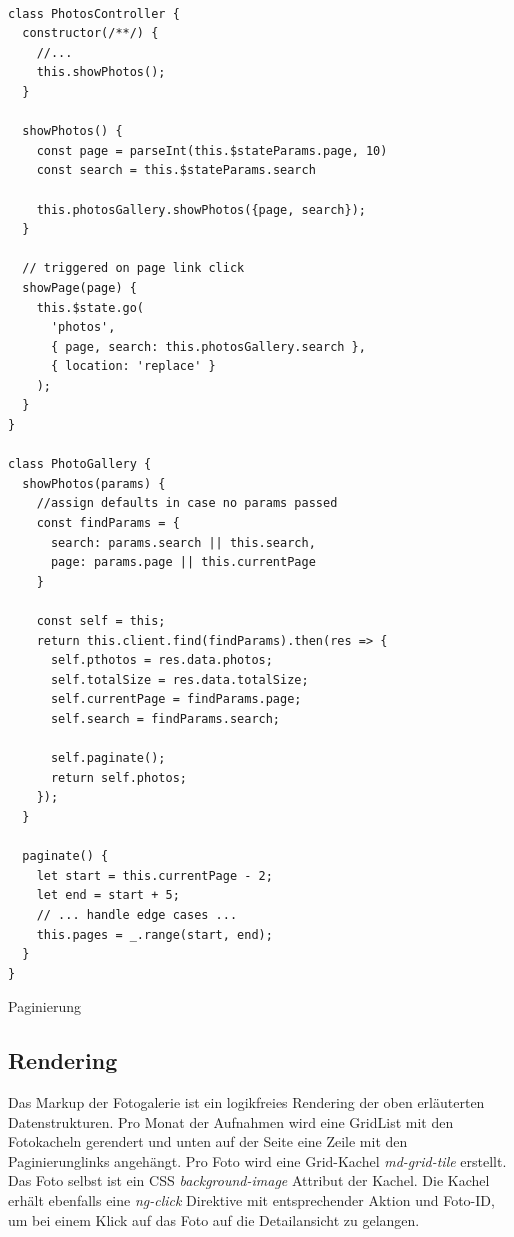 \begin{listing}[H]
\begin{verbatim}

class PhotosController {
  constructor(/**/) {
    //...
    this.showPhotos();
  }

  showPhotos() {
    const page = parseInt(this.$stateParams.page, 10)
    const search = this.$stateParams.search

    this.photosGallery.showPhotos({page, search});
  }

  // triggered on page link click
  showPage(page) {
    this.$state.go(
      'photos',
      { page, search: this.photosGallery.search },
      { location: 'replace' }
    );
  }
}

class PhotoGallery {
  showPhotos(params) {
    //assign defaults in case no params passed
    const findParams = {
      search: params.search || this.search,
      page: params.page || this.currentPage
    }

    const self = this;
    return this.client.find(findParams).then(res => {
      self.pthotos = res.data.photos;
      self.totalSize = res.data.totalSize;
      self.currentPage = findParams.page;
      self.search = findParams.search;

      self.paginate();
      return self.photos;
    });
  }

  paginate() {
    let start = this.currentPage - 2;
    let end = start + 5;
    // ... handle edge cases ...
    this.pages = _.range(start, end);
  }
}

\end{verbatim}
\caption{Paginierung}
\label{lst:pagination}
\end{listing}

\subsection{Rendering}
\label{sec:rendering}

Das Markup der Fotogalerie ist ein logikfreies Rendering der oben erläuterten Datenstrukturen. Pro Monat der Aufnahmen wird eine GridList mit den Fotokacheln gerendert und unten auf der Seite eine Zeile mit den Paginierunglinks angehängt.
Pro Foto wird eine Grid-Kachel \textit{md-grid-tile} erstellt. Das Foto selbst ist ein CSS \textit{background-image} Attribut der Kachel. Die Kachel erhält ebenfalls eine \textit{ng-click} Direktive mit entsprechender Aktion und Foto-ID, um bei einem Klick auf das Foto auf die Detailansicht zu gelangen.

